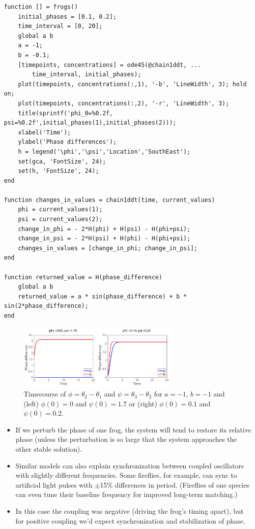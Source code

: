 \documentclass{article}
\begin{document}
\begin{lstlisting}
function [] = frogs()
    initial_phases = [0.1, 0.2];
    time_interval = [0, 20];
    global a b
    a = -1;
    b = -0.1;
    [timepoints, concentrations] = ode45(@chain1ddt, ...
        time_interval, initial_phases);
    plot(timepoints, concentrations(:,1), '-b', 'LineWidth', 3); hold on;
    plot(timepoints, concentrations(:,2), '-r', 'LineWidth', 3);
    title(sprintf('phi_0=%0.2f, psi=%0.2f',initial_phases(1),initial_phases(2)));
    xlabel('Time');
    ylabel('Phase differences');
    h = legend('\phi','\psi','Location','SouthEast');
    set(gca, 'FontSize', 24);
    set(h, 'FontSize', 24);
end

function changes_in_values = chain1ddt(time, current_values)
    phi = current_values(1);
    psi = current_values(2);
    change_in_phi = - 2*H(phi) + H(psi) - H(phi+psi);
    change_in_psi = - 2*H(psi) + H(phi) - H(phi+psi);
    changes_in_values = [change_in_phi; change_in_psi];
end

function returned_value = H(phase_difference)
    global a b
    returned_value = a * sin(phase_difference) + b * sin(2*phase_difference);
end
\end{lstlisting}

\begin{figure}
\begin{center}
\includegraphics[width=0.7\textwidth]{frogs.pdf}
\caption{Timecourse of $\phi=\theta_2 - \theta_1$ and $\psi = \theta_3 - \theta_2$ for $a=-1$, $b=-1$ and (left) $\phi(0) = 0$ and $\psi(0) = 1.7$ or (right) $\phi(0)=0.1$ and $\psi(0) = 0.2$.}
\end{center}
\end{figure}
\begin{itemize}
\item If we perturb the phase of one frog, the system will tend to restore its relative phase (unless the perturbation is so large that the system approaches the other stable solution).
\item Similar models can also explain synchronization between coupled oscillators with slightly different frequencies. Some fireflies, for example, can sync to artificial light pulses with $\pm$15\% differences in period. (Fireflies of one species can even tune their baseline frequency for improved long-term matching.)
\item In this case the coupling was negative (driving the frog's timing apart), but for positive coupling we'd expect synchronization and stabilization of phase.
\end{itemize}
\end{document}
